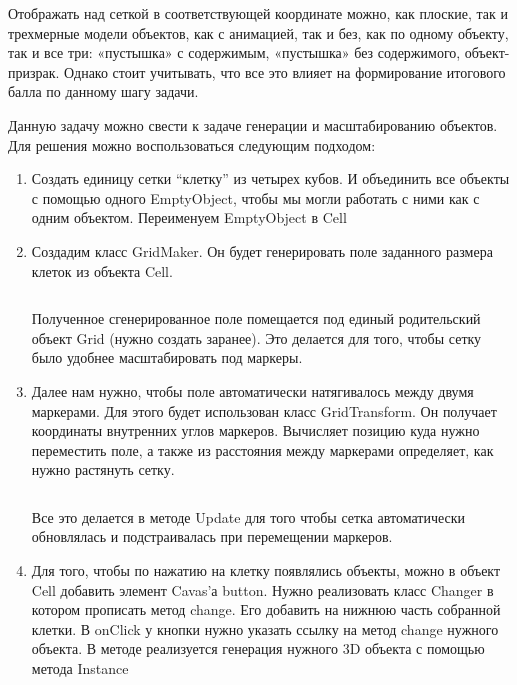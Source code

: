 Отображать над сеткой в соответствующей координате можно, как плоские, так и трехмерные модели объектов, как с анимацией, так и без, как по одному объекту, так и все три: «пустышка» с содержимым, «пустышка» без содержимого, объект-призрак. Однако стоит учитывать, что все это влияет на формирование итогового балла по данному шагу задачи.

\solutionSection

Данную задачу можно свести к задаче генерации и масштабированию объектов. Для решения можно воспользоваться следующим подходом:

\begin{enumerate}
    \item Создать единицу сетки “клетку” из четырех кубов. И объединить все объекты с помощью одного EmptyObject, чтобы мы могли работать с ними как с одним объектом. Переименуем EmptyObject в Cell
    \item Создадим класс GridMaker. Он будет генерировать поле заданного размера клеток из объекта Cell.
    \inputminted[fontsize=\footnotesize, linenos]{csharp}{2nd_tour/ar/task_69/source_1.cs}

    Полученное сгенерированное поле помещается под единый родительский объект Grid (нужно создать заранее). Это делается для того, чтобы сетку было удобнее масштабировать под маркеры. 
    \item Далее нам нужно, чтобы поле автоматически натягивалось между двумя маркерами. Для этого будет использован класс GridTransform. Он получает координаты внутренних углов маркеров. Вычисляет позицию куда нужно переместить поле, а также из расстояния между маркерами определяет, как нужно растянуть сетку.  
    \inputminted[fontsize=\footnotesize, linenos]{csharp}{2nd_tour/ar/task_69/source_2.cs}
    Все это делается в методе Update для того чтобы сетка автоматически обновлялась и подстраивалась при перемещении маркеров.
    \item Для того, чтобы по нажатию на клетку появлялись объекты, можно в объект Cell  добавить элемент Cavas'а button. Нужно реализовать класс Changer в котором прописать метод change. Его добавить на нижнюю часть собранной клетки. В onClick у кнопки нужно указать ссылку на метод change нужного объекта.  В методе реализуется генерация нужного 3D объекта с помощью метода Instance
\end{enumerate}